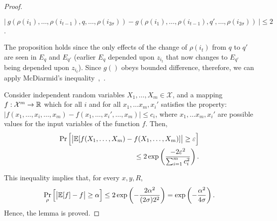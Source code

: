 \begin{proof}
\begin{prop}
$|~ g(\rho(i_1), \ldots, \rho(i_{t-1}), q, \ldots, \rho(i_{2\sigma})) - g(\rho(i_1), \ldots, \rho(i_{t-1}), q', \ldots, \rho(i_{2\sigma})) ~| \le 2$.
\end{prop}
The proposition holds since the only effects of the change of $\rho(i_t)$ from $q$ to $q'$ are seen in $E_q$ and $E_{q'}$ (earlier $E_q$ depended upon $z_{i_t}$ that now changes to $E_{q'}$ being depended upon $z_{i_t}$). Since $g()$ obeys bounded difference, therefore, we can apply McDiarmid's inequality~\cite[Ch~17]{upfal},~\cite{mcdiarmid_1989}.
\begin{thm}
Consider independent random variables $X_1,\ldots , X_m \in \mathcal{X}$, and a mapping $ f:\mathcal{X}^m \rightarrow \mathbb{R}$ which   for all $i$ and for all $x_1,\ldots x_m, {x_i}'$ satisfies the property:
$|f(x_1,\ldots,x_i,\ldots,x_m)-f(x_1,\ldots,{x_i}',\ldots,x_m)|\leq c_i$, where $x_1,\ldots x_m, {x_i}'$ are possible values for the input variables of the function $f$. Then,
    \begin{align*}
	\Pr\Big[ \big| \mathbb{E}[f(X_1,\ldots , X_m) - f(X_1,\ldots , X_m)]\big|  \geq \varepsilon \Big] \\
	\leq 2\exp \left(\frac{-2\varepsilon^2}{\sum_{i=1}^m c_i^2} \right).
    \end{align*}
\end{thm}

This inequality implies that, for every $x,y,R$,
$$\Pr_{\rho} \Big[ \big| \mathbb{E}[f] - f \big| \ge \alpha \Big] \le 2\exp\left( -\frac{2\alpha^2}{(2\sigma)2^2} \right) = \exp \left( - \frac{\alpha^2}{4\sigma} \right).$$
Hence, the lemma is proved.
\end{proof}

